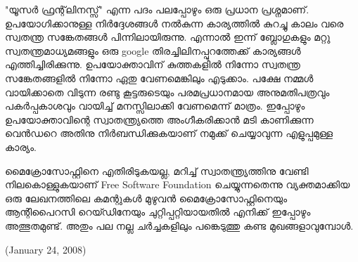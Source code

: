 "യൂസര്‍ ഫ്രന്റ്‌ലിനസ്സ്" എന്ന പദം പലപ്പോഴും ഒരു പ്രധാന പ്രശ്നമാണ്. ഉപയോഗിക്കാനുള്ള നിര്‍‌ദ്ദേശങ്ങള്‍ നല്‍കുന്ന കാര്യത്തില്‍ 
കുറച്ചു കാലം വരെ സ്വതന്ത്ര സങ്കേതങ്ങള്‍ പിന്നിലായിരുന്നു. എന്നാല്‍ ഇന്ന് ബ്ലോഗുകളും മറ്റു സ്വതന്ത്രമാധ്യമങ്ങളും ഒരു google 
തിരച്ചിലിനപ്പുറത്തേക്ക് കാര്യങ്ങള്‍ എത്തിച്ചിരിക്കുന്നു. ഉപയോക്താവിന് കുത്തകളില്‍ നിന്നോ സ്വതന്ത്ര സങ്കേതങ്ങളില്‍ നിന്നോ 
ഏതു വേണമെങ്കിലും എടുക്കാം. പക്ഷേ നമ്മള്‍ വായിക്കാതെ വിടുന്ന രണ്ടു കൂട്ടരുടെയും പരമപ്രധാനമായ അനുമതിപത്രവും 
പകര്‍പ്പകാശവും വായിച്ച് മനസ്സിലാക്കി വേണമെന്ന് മാത്രം. ഇപ്പോഴും ഉപയോക്താവിന്റെ സ്വാതന്ത്ര്യത്തെ അംഗീകരിക്കാന്‍ മടി 
കാണിക്കുന്ന വെന്‍ഡറെ അതിനു നിര്‍ബന്ധിക്കുകയാണ് നമുക്ക് ചെയ്യാവുന്ന എളുപ്പമുള്ള കാര്യം.

മൈക്രോസോഫ്റ്റിനെ എതിരിടുകയല്ല, മറിച്ച് സ്വാതന്ത്ര്യത്തിനു വേണ്ടി നിലകൊള്ളുകയാണ് Free Software Foundation 
ചെയ്യുന്നതെന്നു വ്യക്തമാക്കിയ ഒരു ലേഖനത്തിലെ കമന്റുകള്‍ മുഴുവന്‍ മൈക്രോസോഫ്റ്റിനെയും ആന്റിപൈറസി റെയ്ഡിനേയും 
ചുറ്റിപ്പറ്റിയായതില്‍ എനിക്ക് ഇപ്പോഴും അത്ഭുതമുണ്ട്. അതും പല നല്ല ചര്‍ച്ചകളിലും പങ്കെടുത്തു കണ്ട മുഖങ്ങളാവുമ്പോള്‍.


(January 24, 2008)
\newpage
